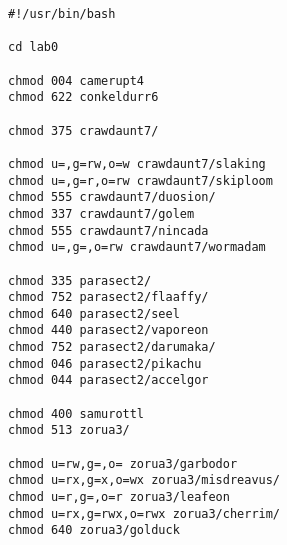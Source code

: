 \begin{verbatim}
#!/usr/bin/bash

cd lab0

chmod 004 camerupt4
chmod 622 conkeldurr6

chmod 375 crawdaunt7/

chmod u=,g=rw,o=w crawdaunt7/slaking
chmod u=,g=r,o=rw crawdaunt7/skiploom
chmod 555 crawdaunt7/duosion/
chmod 337 crawdaunt7/golem
chmod 555 crawdaunt7/nincada
chmod u=,g=,o=rw crawdaunt7/wormadam

chmod 335 parasect2/
chmod 752 parasect2/flaaffy/
chmod 640 parasect2/seel
chmod 440 parasect2/vaporeon
chmod 752 parasect2/darumaka/
chmod 046 parasect2/pikachu
chmod 044 parasect2/accelgor

chmod 400 samurottl
chmod 513 zorua3/

chmod u=rw,g=,o= zorua3/garbodor
chmod u=rx,g=x,o=wx zorua3/misdreavus/
chmod u=r,g=,o=r zorua3/leafeon
chmod u=rx,g=rwx,o=rwx zorua3/cherrim/
chmod 640 zorua3/golduck
\end{verbatim}

